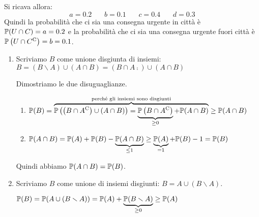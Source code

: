 Si ricava allora:
\begin{equation*}
a=0.2\ \ \ \ \ \ \ \ b=0.1\ \ \ \ \ \ \ \ c=0.4\ \ \ \ \ \ \ \ d=0.3
\end{equation*}
Quindi la probabilità che ci sia una consegna urgente in città è $\mathbb{P}( U\cap C) =a=0.2$ e la probabilità che ci sia una consegna urgente fuori città è $\mathbb{P}\left( U\cap C^{\mathrm{C}}\right) =b=0.1$.
\Soluzione
\begin{enumerate}
\item Scriviamo $B$ come unione disgiunta di insiemi: $B=( B\smallsetminus A) \cup ( A\cap B) =\left( B\cap A\comp\right) \cup ( A\cap B)$

Dimostriamo le due disuguaglianze.
\begin{enumerate}
\item $\mathbb{P}( B) =\overbrace{\mathbb{P}\left(\left( B\cap A^{\mathrm{C}}\right) \cup ( A\cap B)\right) =\underbrace{\mathbb{P}\left( B\cap A^{\mathrm{C}}\right)}_{\geq 0} +\mathbb{P}( A\cap B)}^{\text{perché gli insiemi sono disgiunti}} \geq \mathbb{P}( A\cap B)$
\item $\mathbb{P}( A\cap B) =\mathbb{P}( A) +\mathbb{P}( B) -\underbrace{\mathbb{P}( A\cap B)}_{\leq 1} \geq \underbrace{\mathbb{P}( A)}_{=1} +\mathbb{P}( B) -1=\mathbb{P}( B)$
\end{enumerate}

Quindi abbiamo $\mathbb{P}( A\cap B) =\mathbb{P}( B)$.
\item Scriviamo $B$ come unione di insiemi disgiunti: $B=A\cup ( B\smallsetminus A)$.

$\mathbb{P}( B) =\mathbb{P}( A\cup ( B\smallsetminus A)) =\mathbb{P}( A) +\underbrace{\mathbb{P}( B\smallsetminus A)}_{\geq 0} \geq \mathbb{P}( A)$
\end{enumerate}
\Soluzione

